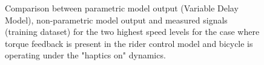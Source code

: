  \begin{figure}
    \centering
    \begin{subfigure}[b]{\textwidth}
        \centering
        \caption{}
        \label{fig:dm_fit3}
    \end{subfigure}
    \begin{subfigure}[b]{\textwidth}
        \centering
        \caption{}
        \label{fig:dm_fit4}
    \end{subfigure}
    
    \caption{Comparison between parametric model output (Variable Delay Model), non-parametric model output and measured signals (training dataset) for the two highest speed levels for the case where torque feedback is present in the rider control model and bicycle is operating under the "haptics on" dynamics.}
    \label{fig:dm_fitB}
 \end{figure}

